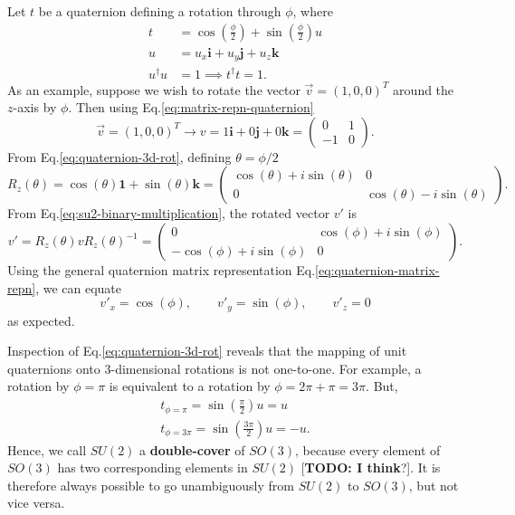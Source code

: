 \documentclass[11pt]{article}
\numberwithin{equation}{section}
\begin{document}
Let $t$ be a quaternion defining a rotation through $\phi$, where
\begin{align}
t &= \cos(\frac{\phi}{2}) + \sin(\frac{\phi}{2})u \label{eq:quaternion-3d-rot} \\
u &= u_x \mathbf{i} + u_y \mathbf{j} + u_z \mathbf{k} \\
u^\dagger u &= 1 \implies t^\dagger t = 1.
\end{align}
As an example, suppose we wish to rotate the vector $\vec{v}=(1,0,0)^T$ around the $z$-axis by $\phi$. Then using Eq.\eqref{eq:matrix-repn-quaternion}
\begin{equation}
\vec{v}=(1,0,0)^T \rightarrow v = 1\mathbf{i} + 0 \mathbf{j} + 0 \mathbf{k} = \begin{pmatrix}
0 & 1\\
-1 & 0
\end{pmatrix}.
\end{equation}
From Eq.\eqref{eq:quaternion-3d-rot}, defining $\theta = \phi/2$
\begin{equation}
R_z(\theta)=\cos(\theta) \mathbf{1} + \sin(\theta)\mathbf{k} = \begin{pmatrix}
\cos(\theta) + i \sin(\theta) & 0 \\
0 & \cos(\theta) - i \sin(\theta)
\end{pmatrix}.
\end{equation}
From Eq.\eqref{eq:su2-binary-multiplication}, the rotated vector $v'$ is
\begin{equation}
v' = R_z(\theta) v R_z(\theta)^{-1} = \begin{pmatrix}
0 & \cos(\phi) + i \sin(\phi) \\
-\cos(\phi) + i \sin(\phi) & 0
\end{pmatrix}.
\end{equation}
Using the general quaternion matrix representation Eq.\eqref{eq:quaternion-matrix-repn}, we can equate
\begin{equation}
v'_x = \cos(\phi), \qquad v'_y = \sin(\phi), \qquad v'_z = 0
\end{equation}
as expected.

Inspection of Eq.\eqref{eq:quaternion-3d-rot} reveals that the mapping of unit quaternions onto 3-dimensional rotations is not one-to-one. For example, a rotation by $\phi=\pi$ is equivalent to a rotation by $\phi = 2\pi + \pi = 3\pi$. But,
\begin{align}
t_{\phi=\pi} = \sin(\frac{\pi}{2}) u = u \\
t_{\phi=3\pi} = \sin(\frac{3\pi}{2}) u = -u.
\end{align}
Hence, we call $SU(2)$ a \textbf{double-cover} of $SO(3)$, because every element of $SO(3)$ has two corresponding elements in $SU(2)$ [\textbf{TODO: I think}?]. It is therefore always possible to go unambiguously from $SU(2)$ to $SO(3)$, but not vice versa. 
\end{document}
